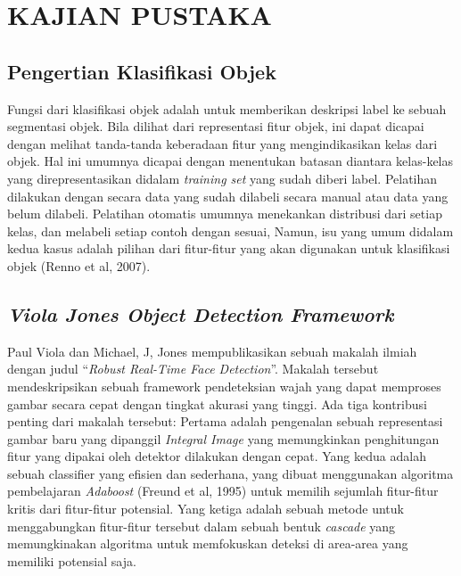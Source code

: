
\chapter{KAJIAN PUSTAKA}

\section{Pengertian Klasifikasi Objek}

Fungsi dari klasifikasi objek adalah untuk memberikan deskripsi label ke 
sebuah segmentasi objek. Bila dilihat dari representasi fitur objek, ini 
dapat dicapai dengan melihat tanda-tanda keberadaan fitur yang mengindikasikan 
kelas dari objek. Hal ini umumnya dicapai dengan menentukan batasan diantara 
kelas-kelas yang direpresentasikan didalam \textit{training set} yang sudah diberi label. 
Pelatihan dilakukan dengan secara data yang sudah dilabeli secara manual atau 
data yang belum dilabeli. Pelatihan otomatis umumnya menekankan distribusi dari 
setiap kelas, dan melabeli setiap contoh dengan sesuai, Namun, isu yang umum 
didalam kedua kasus adalah pilihan dari fitur-fitur yang akan digunakan untuk 
klasifikasi objek (Renno et al, 2007).

\section{\emph{Viola Jones Object Detection Framework}}

Paul Viola dan Michael, J, Jones mempublikasikan sebuah makalah ilmiah dengan 
judul “\emph{Robust Real-Time Face Detection}”. Makalah tersebut mendeskripsikan sebuah 
framework pendeteksian wajah yang dapat memproses gambar secara cepat dengan 
tingkat akurasi yang tinggi. Ada tiga kontribusi penting dari makalah tersebut: 
Pertama adalah pengenalan sebuah representasi gambar baru yang dipanggil 
\emph{Integral Image} yang memungkinkan penghitungan fitur yang dipakai oleh detektor 
dilakukan dengan cepat. Yang kedua adalah sebuah classifier yang efisien dan 
sederhana, yang dibuat menggunakan algoritma pembelajaran \emph{Adaboost} 
(Freund et al, 1995) untuk memilih sejumlah fitur-fitur kritis dari 
fitur-fitur potensial. Yang ketiga adalah sebuah metode untuk menggabungkan 
fitur-fitur tersebut dalam sebuah bentuk \emph{cascade} yang memungkinakan algoritma 
untuk memfokuskan deteksi di area-area yang memiliki potensial saja.

